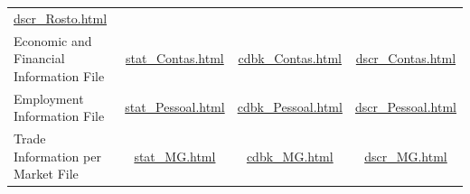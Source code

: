 \documentclass[]{book}
\begin{document}
\begin{longtable}[]{@{}lccc@{}}
\begin{minipage}[t]{0.23\columnwidth}
\href{./Auxiliary\%20Files/describe_dataset/dscr_Rosto.html}{dscr\_Rosto.html}\strut
\end{minipage}\tabularnewline
\begin{minipage}[t]{0.19\columnwidth}\raggedright
Economic and Financial Information File\strut
\end{minipage} & \begin{minipage}[t]{0.23\columnwidth}\centering
\href{./Auxiliary\%20Files/descriptive_statistics/stat_Contas.html}{stat\_Contas.html}\strut
\end{minipage} & \begin{minipage}[t]{0.23\columnwidth}\centering
\href{./Auxiliary\%20Files/codebook/cdbk_Contas.html}{cdbk\_Contas.html}\strut
\end{minipage} & \begin{minipage}[t]{0.23\columnwidth}\centering
\href{./Auxiliary\%20Files/describe_dataset/dscr_Contas.html}{dscr\_Contas.html}\strut
\end{minipage}\tabularnewline
\begin{minipage}[t]{0.19\columnwidth}\raggedright
Employment Information File\strut
\end{minipage} & \begin{minipage}[t]{0.23\columnwidth}\centering
\href{./Auxiliary\%20Files/descriptive_statistics/stat_Pessoal.html}{stat\_Pessoal.html}\strut
\end{minipage} & \begin{minipage}[t]{0.23\columnwidth}\centering
\href{./Auxiliary\%20Files/codebook/cdbk_Pessoal.html}{cdbk\_Pessoal.html}\strut
\end{minipage} & \begin{minipage}[t]{0.23\columnwidth}\centering
\href{./Auxiliary\%20Files/describe_dataset/dscr_Pessoal.html}{dscr\_Pessoal.html}\strut
\end{minipage}\tabularnewline
\begin{minipage}[t]{0.19\columnwidth}\raggedright
Trade Information per Market File\strut
\end{minipage} & \begin{minipage}[t]{0.23\columnwidth}\centering
\href{./Auxiliary\%20Files/descriptive_statistics/stat_MG.html}{stat\_MG.html}\strut
\end{minipage} & \begin{minipage}[t]{0.23\columnwidth}\centering
\href{./Auxiliary\%20Files/codebook/cdbk_MG.html}{cdbk\_MG.html}\strut
\end{minipage} & \begin{minipage}[t]{0.23\columnwidth}\centering
\href{./Auxiliary\%20Files/describe_dataset/dscr_MG.html}{dscr\_MG.html}\strut
\end{minipage}\tabularnewline
\bottomrule
\end{longtable}
\end{document}
